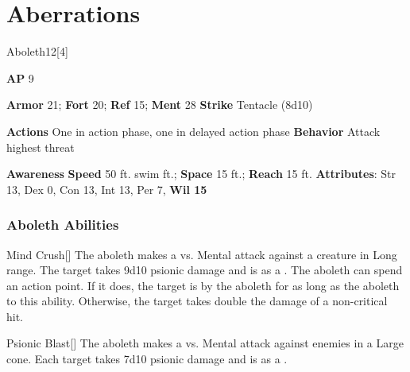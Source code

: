 
\section{Aberrations}
\begin{monsection}{Aboleth}{12}[4]
\vspace{-1em}\vspace{-1em}
\begin{spellcontent}
\begin{spelltargetinginfo}
{\textbf{AP} 9}

\pari \textbf{Armor} 21;
\textbf{Fort} 20;
\textbf{Ref} 15;
\textbf{Ment} 28
\pari \textbf{Strike} Tentacle  (8d10)


\pari \textbf{Actions} One in action phase, one in delayed action phase
\pari \textbf{Behavior} Attack highest threat
\end{spelltargetinginfo}
\end{spellcontent}

\begin{monsterfooter}
\pari \textbf{Awareness} 
\pari \textbf{Speed} 50 ft. swim ft.;
\textbf{Space} 15 ft.;
\textbf{Reach} 15 ft.
\pari \textbf{Attributes}:
Str 13,
Dex 0,
Con 13,
Int 13,
Per 7,
\textbf{Wil 15}
\end{monsterfooter}
\end{monsection}


\subsubsection{Aboleth Abilities}

\begin{ability}{Mind Crush}[]
The aboleth makes a  vs. Mental attack against a creature in Long range.
\hit The target takes 9d10 psionic damage and is  as a .
\crit The aboleth can spend an action point.
If it does, the target is  by the aboleth for as long as the aboleth  to this ability.
Otherwise, the target takes double the damage of a non-critical hit.
\end{ability}

\vspace{0.5em}
\begin{ability}{Psionic Blast}[]
The aboleth makes a  vs. Mental attack against enemies in a Large cone.
\hit Each target takes 7d10 psionic damage and is  as a .
\end{ability}


